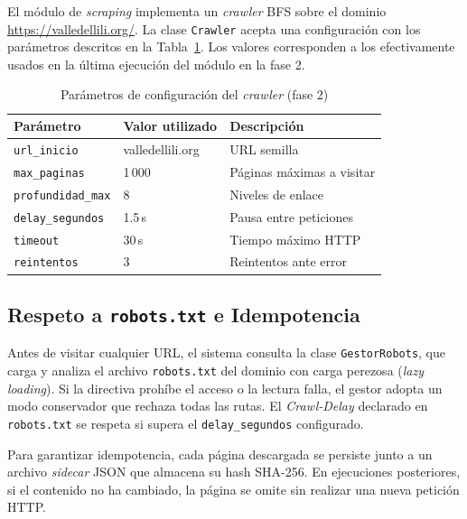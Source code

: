 \documentclass[conference]{IEEEtran}
\newcommand{\code}[1]{\texttt{\small #1}}
\begin{document}
El módulo de \textit{scraping} implementa un \textit{crawler} BFS sobre el
dominio \url{https://valledellili.org/}. La clase \code{Crawler} acepta una
configuración con los parámetros descritos en la Tabla~\ref{tab:crawler}.
Los valores corresponden a los efectivamente usados en la última ejecución
del módulo en la fase 2.

\begin{table}[ht]
\centering
\caption{Parámetros de configuración del \textit{crawler} (fase 2)}
\label{tab:crawler}
\setlength{\tabcolsep}{4pt}
\begin{tabular}{@{}lll@{}}
\toprule
\textbf{Parámetro} & \textbf{Valor utilizado} & \textbf{Descripción} \\
\midrule
\code{url\_inicio}      & valledellili.org & URL semilla               \\
\code{max\_paginas}     & 1\,000           & Páginas máximas a visitar \\
\code{profundidad\_max} & 8                & Niveles de enlace         \\
\code{delay\_segundos}  & 1.5\,s           & Pausa entre peticiones    \\
\code{timeout}          & 30\,s            & Tiempo máximo HTTP        \\
\code{reintentos}       & 3                & Reintentos ante error     \\
\bottomrule
\end{tabular}
\end{table}

\subsection{Respeto a \texttt{robots.txt} e Idempotencia}

Antes de visitar cualquier URL, el sistema consulta la clase
\code{GestorRobots}, que carga y analiza el archivo \code{robots.txt} del
dominio con carga perezosa (\textit{lazy loading}). Si la directiva prohíbe
el acceso o la lectura falla, el gestor adopta un modo conservador que
rechaza todas las rutas. El \textit{Crawl-Delay} declarado en
\code{robots.txt} se respeta si supera el \code{delay\_segundos} configurado.

Para garantizar idempotencia, cada página descargada se persiste junto a un
archivo \textit{sidecar} JSON que almacena su hash SHA-256. En ejecuciones
posteriores, si el contenido no ha cambiado, la página se omite sin realizar
una nueva petición HTTP.
\end{document}
